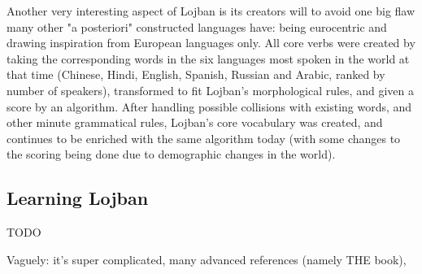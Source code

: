 Another very interesting aspect of Lojban is its creators will to avoid one big flaw many other "a posteriori" constructed languages have: being
eurocentric and drawing inspiration from European languages only. All core verbs were created by taking the corresponding words in the six languages most spoken
in the world at that time (Chinese, Hindi, English, Spanish, Russian and Arabic, ranked by number of speakers), transformed to fit Lojban's morphological rules,
and given a score by an algorithm. After handling possible collisions with existing words, and other minute grammatical rules, Lojban's core vocabulary
was created, and continues to be enriched with the same algorithm today (with some changes to the scoring being done due to demographic changes in the world).

\subsection{Learning Lojban}
\label{subsec:learning-lojban}

TODO

Vaguely: it's super complicated, many advanced references (namely THE book),